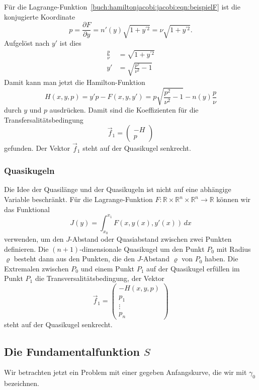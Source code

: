 \begin{beispiel}
\label{buch:hamiltonjacobi:jacobi:bsp:beispielFH}
Für die Lagrange-Funktion~\eqref{buch:hamiltonjacobi:jacobi:eqn:beispielF}
ist die konjugierte Koordinate
\[
p
=
\frac{\partial F}{\partial y}
=
n'(y)\sqrt{1+y^{\prime 2}}
=
\nu \sqrt{1+y^{\prime 2}}.
\]
Aufgelöst nach $y'$ ist dies
\begin{align*}
\frac{p}{\nu}
&=
\sqrt{1+y^{\prime 2}}
\\
y'
&=
\sqrt{ \frac{p^2}{\nu^2} -1 }
\end{align*}
Damit kann man jetzt die Hamilton-Funktion
\[
H(x,y,p)
=
y'p - F(x,y,y')
=
p\sqrt{\frac{p^2}{\nu^2}-1}
-
n(y) \frac{p}{\nu}
\]
durch $y$ und $p$ ausdrücken.
Damit sind die Koeffizienten für die Transfersalitätsbedingung
\[
\vec{f}_1
=
\begin{pmatrix} 
-H\\
p
\end{pmatrix}
\]
gefunden.
Der Vektor $\vec{f}_1$ steht auf der Quasikugel senkrecht.
\end{beispiel}

%
%
\subsubsection{Quasikugeln}
Die Idee der Quasilänge und der Quasikugeln ist nicht auf eine abhängige
Variable beschränkt.
Für die Lagrange-Funktion 
$F\colon \mathbb{R}\times\mathbb{R}^n\times\mathbb{R}^n\to\mathbb{R}$
können wir das Funktional
\[
J(y) = \int_{x_0}^{x_1} F(x,y(x),y'(x))\,dx
\]
verwenden, um den $J$-Abstand oder Quasiabstand zwischen zwei Punkten
definieren.
Die $(n+1)$-dimensionale Quasikugel um den Punkt $P_0$ mit Radius $\varrho$
besteht dann aus den Punkten, die den $J$-Abstand $\varrho$ von $P_0$ haben.
Die Extremalen zwischen $P_0$ und einem Punkt $P_1$ auf der Quasikugel
erfüllen im Punkt $P_1$ die Transversalitätsbedingung, der Vektor
\[
\vec{f}_1
=
\begin{pmatrix}
-H(x,y,p)\\
p_1\\
\vdots\\
p_n
\end{pmatrix}
\]
steht auf der Quasikugel senkrecht.

%
%
\subsection{Die Fundamentalfunktion $S$}
Wir betrachten jetzt ein Problem mit einer gegeben Anfangskurve,
die wir mit $\gamma_0$ bezeichnen.

